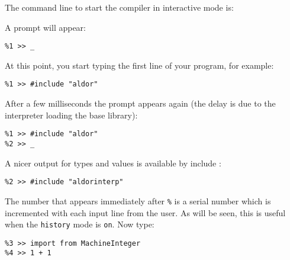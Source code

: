 The command line to start the compiler in interactive mode is:

\begin{small}
\osprompt {}
\end{small}

A prompt will appear:

{\small
\begin{verbatim}
%1 >> _
\end{verbatim}
}

At this point, you start typing the first line of your program, for
example:

{\small
\begin{verbatim}
%1 >> #include "aldor"
\end{verbatim}
}

After a few milliseconds the prompt appears again (the delay is due to the
interpreter loading the base library):

{\small
\begin{verbatim}
%1 >> #include "aldor"
%2 >> _
\end{verbatim}
}

A nicer output for types and values is available by include :
{\small
\begin{verbatim}
%2 >> #include "aldorinterp"
\end{verbatim}
}

The number that appears immediately after \verb"%" is a serial number
which is incremented with each input line from the user.
As will be seen, this is useful when the \verb"history" mode is
\verb"on".  Now type:

{\small
\begin{verbatim}
%3 >> import from MachineInteger
%4 >> 1 + 1
\end{verbatim}
}


